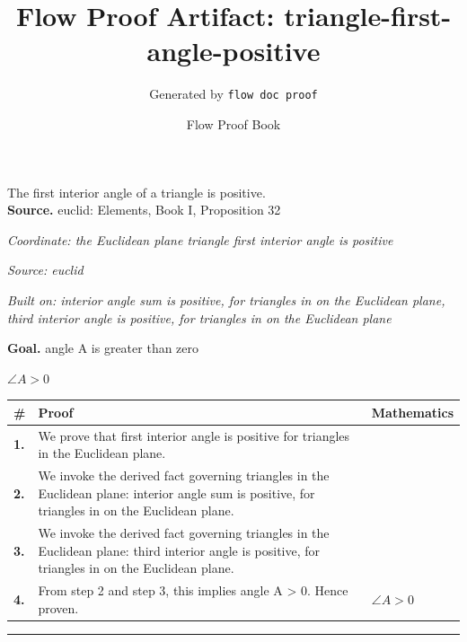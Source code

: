 \documentclass[11pt]{article}
\title{Flow Proof Artifact: triangle-first-angle-positive}
\author{Generated by \texttt{flow doc proof}}
\date{Flow Proof Book}
\theoremstyle{definition}
\begin{document}
\maketitle
The first interior angle of a triangle is positive.\\[0.5em]
\textbf{Source.} euclid: Elements, Book I, Proposition 32\\[0.5em]
\bigskip
{}\par
\smallskip\noindent\textit{Coordinate: the Euclidean plane \cdot triangle \cdot first interior angle is positive}\par
\smallskip\noindent\textit{Source: euclid}\par
\smallskip\noindent\textit{Built on: interior angle sum is positive, for triangles in on the Euclidean plane, third interior angle is positive, for triangles in on the Euclidean plane}\par
\medskip
\noindent\textbf{Goal.} angle A is greater than zero\par
\noindent$\displaystyle \angle A > 0$\par
\medskip
\noindent
\begin{tabular}{@{} >{\raggedright\arraybackslash}p{} >{\raggedright\arraybackslash}p{} >{\raggedleft\arraybackslash}p{} @{}}
\textbf{\#} & \textbf{Proof} & \textbf{Mathematics} \\
\midrule
\textbf{1.} & We prove that first interior angle is positive for triangles in the Euclidean plane. & \\[0.45em]
\textbf{2.} & We invoke the derived fact governing triangles in the Euclidean plane: interior angle sum is positive, for triangles in on the Euclidean plane. & \\[0.45em]
\textbf{3.} & We invoke the derived fact governing triangles in the Euclidean plane: third interior angle is positive, for triangles in on the Euclidean plane. & \\[0.45em]
\textbf{4.} & From step 2 and step 3, this implies angle A > 0. Hence proven. & $\displaystyle \angle A > 0$ \\[0.45em]
\bottomrule
\end{tabular}
\label{thm:Geometry-triangle-first_interior_angle_is_positive}
\par\medskip\hrule
\end{document}
